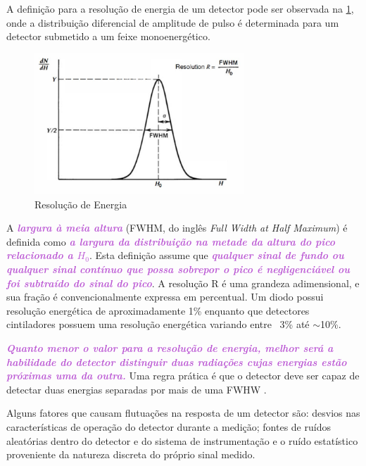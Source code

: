 \documentclass[11pt,a4paper]{article}
\begin{document}
	A definição para a resolução de energia de um detector pode ser observada na  \ref{fig:resolucaoDeEnergia}, onde a distribuição diferencial de amplitude de pulso é determinada para um detector submetido a um feixe monoenergético. 

			\begin{figure}[h]
				\centering
				\includegraphics[width=0.7\textwidth]{Imagens/resolucaoDeEnergia.jpg}
				\caption{Resolução de Energia}
				\label{fig:resolucaoDeEnergia}
			\end{figure}


		A \textcolor{MediumOrchid}{\textit{\textbf{largura à meia altura}}} (FWHM,  do inglês \textit{Full Width at Half Maximum}) é definida como \textcolor{MediumOrchid}{\textit{\textbf{a largura da distribuição na metade da altura do pico relacionado a $H_0$}}}. Esta definição assume que \textcolor{MediumOrchid}{\textit{\textbf{qualquer sinal de fundo ou qualquer sinal contínuo que possa sobrepor o pico é negligenciável ou foi subtraído do sinal do pico}}}. A resolução R é uma grandeza adimensional, e  sua fração é convencionalmente expressa em percentual. Um diodo possui resolução energética de aproximadamente 1\% enquanto que detectores cintiladores possuem uma resolução energética variando entre ~3\% até $\sim$10\%.

		\textcolor{MediumOrchid}{\textit{\textbf{Quanto menor o valor para a resolução de energia, melhor será a habilidade do detector distinguir duas radiações cujas energias estão próximas uma da outra.}}} Uma regra prática é que o detector deve ser capaz de detectar duas energias separadas por mais de uma FWHW .

		Alguns fatores que causam flutuações na resposta de um detector são: desvios nas características de operação do detector durante a medição; fontes de ruídos aleatórias dentro do detector e do sistema de instrumentação e o ruído estatístico proveniente da natureza discreta do próprio sinal medido. 
		
\end{document}
